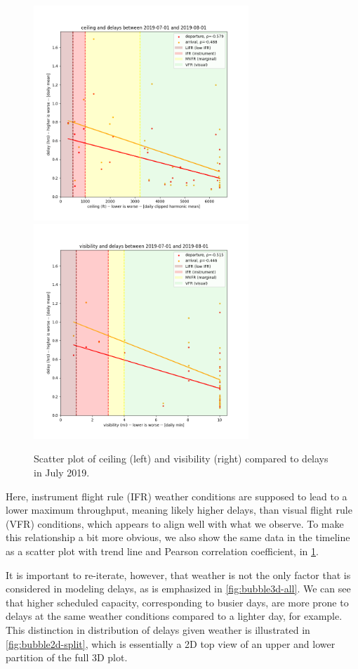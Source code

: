 \begin{figure}[htb!]
    \centering
    \includegraphics[height=8.1cm]{media/lga-analysis-2.png}
    \includegraphics[height=8.1cm]{media/lga-analysis-4.png}
    \caption{Scatter plot of ceiling (left) and visibility (right) compared to delays in July 2019.}
    \label{fig:2019-07-weather-delay-scatter}
\end{figure}

Here, instrument flight rule (IFR) weather conditions are supposed to lead to a lower maximum throughput, meaning likely higher delays, than visual flight rule (VFR) conditions, which appears to align well with what we observe. To make this relationship a bit more obvious, we also show the same data in the timeline as a scatter plot with trend line and Pearson correlation coefficient, in \cref{fig:2019-07-weather-delay-scatter}. 


It is important to re-iterate, however, that weather is not the only factor that is considered in modeling delays, as is emphasized in \cref{fig:bubble3d-all}. We can see that higher scheduled capacity, corresponding to busier days, are more prone to delays at the same weather conditions compared to a lighter day, for example. This distinction in distribution of delays given weather is illustrated in \cref{fig:bubble2d-split}, which is essentially a 2D top view of an upper and lower partition of the full 3D plot.

